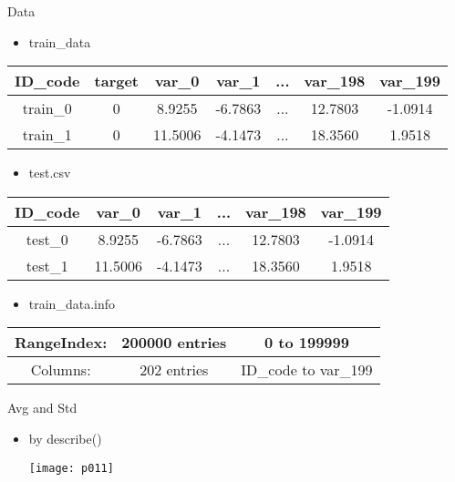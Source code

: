 \documentclass[
 size=12pt,
 paper=smartboard, %
 mode=present, %
 display=slides, %
style=tuliplab,
pauseslide,
fleqn,leqno]{powerdot}
\begin{document}
\begin{slide}{Data}
\begin{itemize}
    \item train_data
\end{itemize}

\begin{tabular}{|c|c|c|c|c|c|c|}%

ID_code&target&var_0&var_1&...&var_198&var_199\\%
 \hline
train_0&0&8.9255 &-6.7863 &...  & 12.7803 & -1.0914  \\
 \hline
train_1&0&11.5006& -4.1473 &...  &18.3560  &   1.9518\\
\end{tabular}
\begin{itemize}
\item test.csv
\end{itemize}

\begin{tabular}{|c|c|c|c|c|c|}%

ID_code&var_0&var_1&...&var_198&var_199\\%
 \hline
test_0&8.9255 &-6.7863 &...  & 12.7803 & -1.0914  \\
 \hline
test_1&11.5006& -4.1473 &...  &18.3560  &   1.9518\\
\end{tabular}
\begin{itemize}
\item train_data.info
\end{itemize}

\begin{tabular}{|c|c|c|}%
 \hline
RangeIndex:&200000 entries&0 to 199999  \\
 \hline
Columns:&202 entries&ID_code to var_199\\
\end{tabular}

\end{slide}

\begin{slide}{Avg and Std }
\begin{itemize}
\item by describe()
\par
\texttt{[image: p011]}

\end{itemize}
\end{slide}
\end{document}

